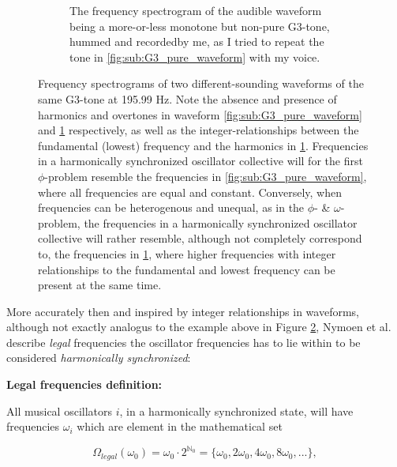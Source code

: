 \begin{figure}[ht!]
\begin{subfigure}[t]{.5\textwidth}
		\caption{The frequency spectrogram of the audible waveform being a more-or-less monotone but non-pure G3-tone, hummed and recorded\protect\footnotemark  by me, as I tried to repeat the tone in \ref{fig:sub:G3_pure_waveform} with my voice.}
		\label{fig:sub:G3_hummed_waveform}
	\end{subfigure}
	\caption[Frequency spectrograms illustrating the absence and presence of harmonics and overtones in audible waveforms.]{Frequency spectrograms of two different-sounding waveforms of the same G3-tone at 195.99 Hz. Note the absence and presence of harmonics and overtones in waveform \ref{fig:sub:G3_pure_waveform} and \ref{fig:sub:G3_hummed_waveform} respectively, as well as the integer-relationships between the fundamental (lowest) frequency and the harmonics in \ref{fig:sub:G3_hummed_waveform}. Frequencies in a harmonically synchronized oscillator collective will for the first $\phi$-problem resemble the frequencies in \ref{fig:sub:G3_pure_waveform}, where all frequencies are equal and constant. Conversely, when frequencies can be heterogenous and unequal, as in the $\phi$- \& $\omega$-problem, the frequencies in a harmonically synchronized oscillator collective will rather resemble, although not completely correspond to, the frequencies in \ref{fig:sub:G3_hummed_waveform}, where higher frequencies with integer relationships to the fundamental and lowest frequency can be present at the same time.}
	\label{fig:frequency_spectrograms}
\end{figure}

\addtocounter{footnote}{-2} %


More accurately then and inspired by integer relationships in waveforms, although not exactly analogus to the example above in Figure \ref{fig:frequency_spectrograms}, Nymoen et al. describe \textit{legal} frequencies the oscillator frequencies has to lie within to be considered \textit{harmonically synchronized}: \nl

\textbf{Legal frequencies definition:} \nl

All musical oscillators $i$, in a harmonically synchronized state, will have frequencies $\omega_i$ which are element in the mathematical set

\begin{equation}\label{legal_freqs}
\Omega_{legal}(\omega_0) = \omega_{0} \cdot 2^{\mathbb{N}_0} = \{\omega_{0}, 2\omega_{0}, 4\omega_{0}, 8\omega_{0}, ...\} ,
\end{equation}

